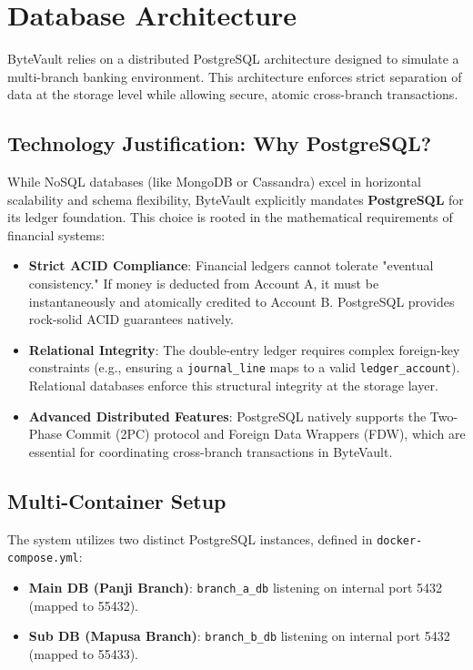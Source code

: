 \section{Database Architecture}

ByteVault relies on a distributed PostgreSQL architecture designed to simulate a multi-branch banking environment. This architecture enforces strict separation of data at the storage level while allowing secure, atomic cross-branch transactions.

\subsection{Technology Justification: Why PostgreSQL?}
While NoSQL databases (like MongoDB or Cassandra) excel in horizontal scalability and schema flexibility, ByteVault explicitly mandates \textbf{PostgreSQL} for its ledger foundation. This choice is rooted in the mathematical requirements of financial systems:
\begin{itemize}
    \item \textbf{Strict ACID Compliance}: Financial ledgers cannot tolerate "eventual consistency." If money is deducted from Account A, it must be instantaneously and atomically credited to Account B. PostgreSQL provides rock-solid ACID guarantees natively.
    \item \textbf{Relational Integrity}: The double-entry ledger requires complex foreign-key constraints (e.g., ensuring a \texttt{journal\_line} maps to a valid \texttt{ledger\_account}). Relational databases enforce this structural integrity at the storage layer.
    \item \textbf{Advanced Distributed Features}: PostgreSQL natively supports the Two-Phase Commit (2PC) protocol and Foreign Data Wrappers (FDW), which are essential for coordinating cross-branch transactions in ByteVault.
\end{itemize}

\subsection{Multi-Container Setup}
The system utilizes two distinct PostgreSQL instances, defined in \texttt{docker-compose.yml}:
\begin{itemize}
  \item \textbf{Main DB (Panji Branch)}: \texttt{branch\_a\_db} listening on internal port 5432 (mapped to 55432).
  \item \textbf{Sub DB (Mapusa Branch)}: \texttt{branch\_b\_db} listening on internal port 5432 (mapped to 55433).
\end{itemize}

